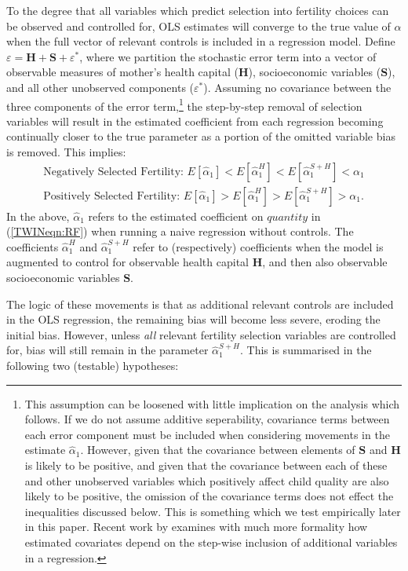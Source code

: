 \documentclass[subeqn]{article}
\begin{document}
\begin{spacing}{1.4}
To the degree that all variables which predict selection into fertility choices
can be observed and controlled for, OLS estimates will converge to the true value
of $\alpha$ when the full vector of relevant controls is included in a regression
model.  Define $\varepsilon=\bm{H}+\bm{S}+\varepsilon^*$, where we partition the
stochastic error term into a vector of observable measures of mother's health
capital ($\bm{H}$), socioeconomic variables ($\bm{S}$), and all other unobserved components
($\varepsilon^*$).  Assuming no covariance between the three components of the
error term,\footnote{This assumption can be loosened with little implication on the
  analysis which follows.  If we do not assume additive seperability, covariance
  terms between each error component must be included when considering movements in
  the estimate $\hat\alpha_1$.  However, given that the covariance between elements
  of $\bm{S}$ and $\bm{H}$ is likely to be positive, and given that the covariance
  between each of these and other unobserved variables which positively affect
  child quality are also likely to be positive, the omission of the covariance
  terms does not effect the inequalities discussed below.  This is something which
  we test empirically later in this paper.  Recent work by \citet{Gelbach2016}
  examines with much more formality how estimated covariates depend on the step-wise
  inclusion of additional variables in a regression.} the step-by-step removal of
selection variables will result in the estimated coefficient from each regression
becoming continually closer to the true parameter as a portion of the omitted
variable bias is removed.  This implies:
\begin{eqnarray}
  \text{Negatively Selected Fertility:\ \ \ } E[\hat\alpha_1] < E[\hat\alpha_1^{H}] < E[\hat\alpha_1^{S+H}] < \alpha_1 \nonumber \\
  \text{Positively Selected Fertility:\ \ \ } E[\hat\alpha_1] > E[\hat\alpha_1^{H}] > E[\hat\alpha_1^{S+H}] > \alpha_1. \nonumber
\end{eqnarray}
In the above, $\hat\alpha_1$ refers to the estimated coefficient on
$quantity$ in (\ref{TWINeqn:RF}) when running a naive regression without
controls.  The coefficients $\hat\alpha_1^H$ and $\hat\alpha_1^{S+H}$
refer to (respectively) coefficients when the model is augmented to
control for observable health capital $\bm{H}$, and then also observable
socioeconomic variables $\bm{S}$.

The logic of these movements is that as additional relevant controls
are included in the OLS regression, the remaining bias will become
less severe, eroding the initial bias.  However, unless \emph{all} relevant
fertility selection variables are controlled for, bias will still remain in
the parameter $\hat\alpha_1^{S+H}$.  This is summarised in the following two
(testable) hypotheses:


\end{spacing}
\end{document}
